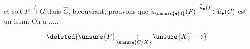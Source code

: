 et soit $F\xrightarrow{f}G$ dans $\widehat C$, bicouvrant, prouvons que
$\widehat u_{\unsure{\bullet|0}}(F)\xrightarrow{\widehat u_{\bullet}(f)}\widehat u_{\bullet}(G)$ est  un isom. On a .....

\[
\deleted{\unsure{F}\mathop{\longrightarrow}_{\unsure{C/X}} \unsure{X}\longrightarrow}
\]
